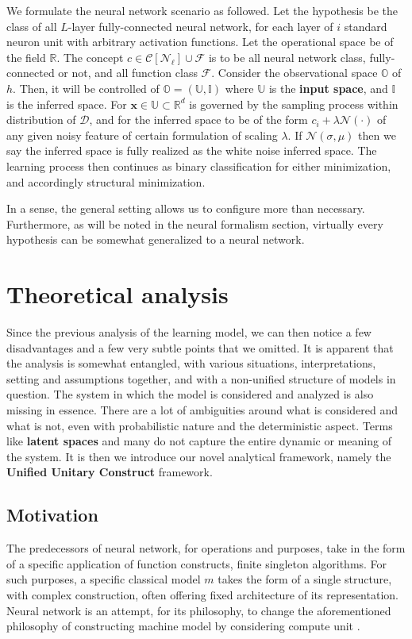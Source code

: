 \documentclass[twoside,10pt]{article}
\begin{document}
\begin{setting}
    We formulate the neural network scenario as followed. Let the hypothesis be the class of all $L$-layer fully-connected neural network, for each layer of $i$ standard neuron unit with arbitrary activation functions. Let the operational space be of the field $\mathbb{R}$. The concept $c\in \mathcal{C}[\mathcal{N}_{\ell}]\cup \mathcal{F}$ is to be all neural network class, fully-connected or not, and all function class $\mathcal{F}$. Consider the observational space $\mathbb{O}$ of $h$. Then, it will be controlled of $\mathbb{O}=(\mathbb{U},\mathbb{I})$ where $\mathbb{U}$ is the \textbf{input space}, and $\mathbb{I}$ is the inferred space. For $\mathbf{x}\in \mathbb{U}\subset \mathbb{R}^{d}$ is governed by the sampling process within distribution of $\mathcal{D}$, and for the inferred space to be of the form $c_{i}+\lambda\mathcal{N}(\cdot)$ of any given noisy feature of certain formulation of scaling $\lambda$. If $\mathcal{N}(\sigma, \mu)$ then we say the inferred space is fully realized as the white noise inferred space. The learning process then continues as binary classification for either minimization, and accordingly structural minimization. 
\end{setting}
In a sense, the general setting allows us to configure more than necessary. Furthermore, as will be noted in the neural formalism section, virtually every hypothesis can be somewhat generalized to a neural network. 

\clearpage 

\section{Theoretical analysis}

Since the previous analysis of the learning model, we can then notice a few disadvantages and a few very subtle points that we omitted. It is apparent that the analysis is somewhat entangled, with various situations, interpretations, setting and assumptions together, and with a non-unified structure of models in question. The system in which the model is considered and analyzed is also missing in essence. There are a lot of ambiguities around what is considered and what is not, even with probabilistic nature and the deterministic aspect. Terms like \textbf{latent spaces} and many do not capture the entire dynamic or meaning of the system. It is then we introduce our novel analytical framework, namely the \textbf{Unified Unitary Construct} framework. 
\subsection{Motivation}
The predecessors of neural network, for operations and purposes, take in the form of a specific application of function constructs, finite singleton algorithms. For such purposes, a specific classical model $m$ takes the form of a single structure, with complex construction, often offering fixed architecture of its representation. Neural network is an attempt, for its philosophy, to change the aforementioned philosophy of constructing machine model by considering compute unit \cite{mcculloch_logical_1943,Rosenblatt1958ThePA}. 
\end{document}
